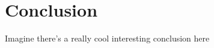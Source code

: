 \section{Conclusion}\label{sec:conclusion}

Imagine there's a really cool interesting conclusion here